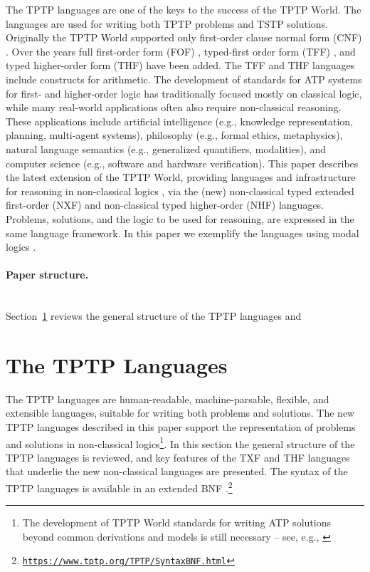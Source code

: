 \documentclass[runningheads]{llncs}
\begin{document}
The TPTP languages \cite{Sut22-IGPL} are one of the keys to the success of the TPTP World.
The languages are used for writing both TPTP problems and TSTP solutions.
Originally the TPTP World supported only first-order clause normal form (CNF) \cite{SS98-JAR}.
Over the years full first-order form (FOF) \cite{Sut09}, typed-first order form (TFF) 
\cite{SS+12,BP13-TFF1}, and typed higher-order form (THF) \cite{SB10,KSR16} have been added.
The TFF and THF languages include constructs for arithmetic.
The development of standards for ATP systems for first- and higher-order logic has traditionally 
focused mostly on classical logic, while many real-world applications often also require 
non-classical reasoning. 
These applications include artificial intelligence (e.g., knowledge representation, planning, 
multi-agent systems), philosophy (e.g., formal ethics, metaphysics), natural language semantics 
(e.g., generalized quantifiers, modalities), and computer science (e.g., software and hardware 
verification).
This paper describes the latest extension of the TPTP World, providing languages and
infrastructure for reasoning in non-classical logics \cite{Pri08,Gob01}, via the (new)
non-classical typed extended first-order (NXF) and non-classical typed higher-order (NHF) 
languages.
Problems, solutions, and the logic to be used for reasoning, are expressed in the same language 
framework.
In this paper we exemplify the languages using modal logics \cite{BBW06}.

\paragraph{Paper structure.}~\\
Section~\ref{TPTPLanguages} reviews the general structure of the TPTP languages and

\section{The TPTP Languages}
\label{TPTPLanguages}

The TPTP languages are human-readable, machine-parsable, flexible, and extensible languages,
suitable for writing both problems and solutions.
The new TPTP languages described in this paper support the representation of problems and
solutions in non-classical logics\footnote{%
The development of TPTP World standards for writing ATP solutions beyond common
derivations and models is still necessary -- see, e.g., \cite{OS10}}.
In this section the general structure of the TPTP languages is reviewed, and key features of
the TXF and THF languages that underlie the new non-classical languages are presented.
The syntax of the TPTP languages is available in an extended BNF \cite{VS06}.\footnote{%
\label{footnote:tptp}
\href{https://www.tptp.org/TPTP/SyntaxBNF.html}{\tt https://www.tptp.org/TPTP/SyntaxBNF.html}}
\end{document}
